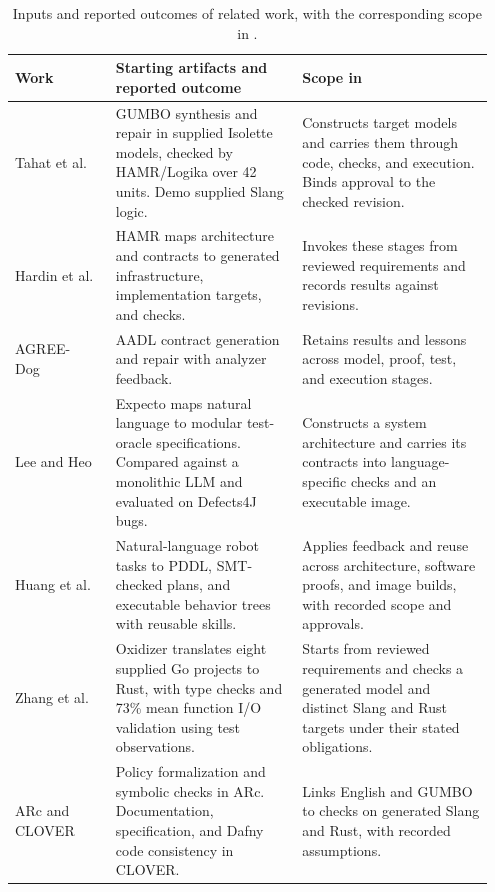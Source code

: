 \begin{table}[!t]
\caption{Inputs and reported outcomes of related work, with the corresponding scope in \workbench{}.}
\label{tab:related-work}
\small
\setlength{\tabcolsep}{4pt}
\begin{tabular}{@{}>{\raggedright\arraybackslash}p{0.20\linewidth}>{\raggedright\arraybackslash}p{0.37\linewidth}>{\raggedright\arraybackslash}p{0.38\linewidth}@{}}
\toprule
Work & Starting artifacts and reported outcome & Scope in \workbench{} \\
\midrule
Tahat et al.~\cite{tahat2026scp,inspecta_repo} & GUMBO synthesis and repair in supplied Isolette models, checked by HAMR/Logika over 42 units. Demo supplied Slang logic. & Constructs target models and carries them through code, checks, and execution. Binds approval to the checked revision. \\
\addlinespace[2pt]
Hardin et al.~\cite{hardin2025dasc,hamr} & HAMR maps architecture and contracts to generated infrastructure, implementation targets, and checks. & Invokes these stages from reviewed requirements and records results against revisions. \\
\addlinespace[2pt]
AGREE-Dog~\cite{agreedog_tahat2025} & AADL contract generation and repair with analyzer feedback. & Retains results and lessons across model, proof, test, and execution stages. \\
\addlinespace[2pt]
Lee and Heo~\cite{lee2026expecto} & Expecto maps natural language to modular test-oracle specifications. Compared against a monolithic LLM and evaluated on Defects4J bugs. & Constructs a system architecture and carries its contracts into language-specific checks and an executable image. \\
\addlinespace[2pt]
Huang et al.~\cite{huang2026robotic} & Natural-language robot tasks to PDDL, SMT-checked plans, and executable behavior trees with reusable skills. & Applies feedback and reuse across architecture, software proofs, and image builds, with recorded scope and approvals. \\
\addlinespace[2pt]
Zhang et al.~\cite{zhang2025oxidizer} & Oxidizer translates eight supplied Go projects to Rust, with type checks and 73\% mean function I/O validation using test observations. & Starts from reviewed requirements and checks a generated model and distinct Slang and Rust targets under their stated obligations. \\
\addlinespace[2pt]
ARc and CLOVER~\cite{bayless2025arc,sun2024clover} & Policy formalization and symbolic checks in ARc. Documentation, specification, and Dafny code consistency in CLOVER. & Links English and GUMBO to checks on generated Slang and Rust, with recorded assumptions. \\

\end{tabular}
\end{table}
